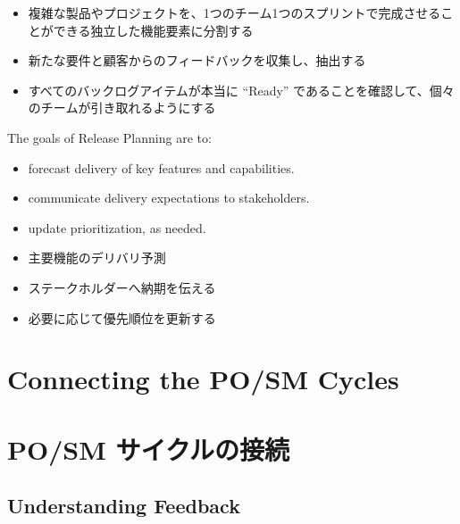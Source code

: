 \documentclass[12pt,a4paper,parskip=full]{scrartcl}
\begin{document}
\fi
\begin{itemize}
\item 複雑な製品やプロジェクトを、1つのチーム1つのスプリントで完成させることができる独立した機能要素に分割する
\item 新たな要件と顧客からのフィードバックを収集し、抽出する
\item すべてのバックログアイテムが本当に ``Ready'' であることを確認して、個々のチームが引き取れるようにする
\end{itemize}
The goals of Release Planning are to:
\begin{itemize}
\item forecast delivery of key features and capabilities.
\item communicate delivery expectations to stakeholders.
\item update prioritization, as needed.
\end{itemize}
\fi
\begin{itemize}
\item 主要機能のデリバリ予測
\item ステークホルダーへ納期を伝える
\item 必要に応じて優先順位を更新する
\end{itemize}

\section{Connecting the PO/SM Cycles}
\fi
\section{PO/SM サイクルの接続}

\subsection{Understanding Feedback}
\fi
\end{document}
